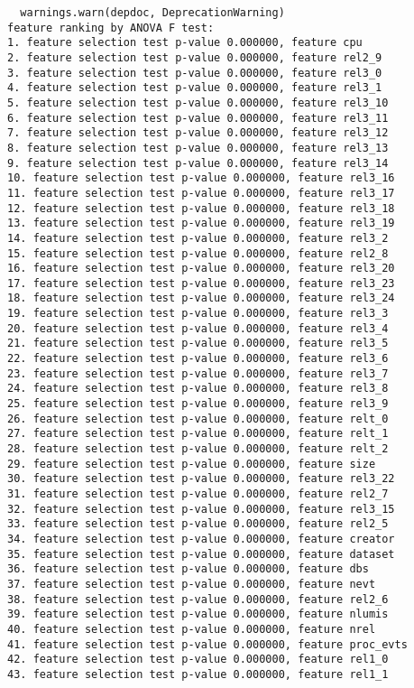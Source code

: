 \begin{verbatim}
  warnings.warn(depdoc, DeprecationWarning)
feature ranking by ANOVA F test:
1. feature selection test p-value 0.000000, feature cpu
2. feature selection test p-value 0.000000, feature rel2_9
3. feature selection test p-value 0.000000, feature rel3_0
4. feature selection test p-value 0.000000, feature rel3_1
5. feature selection test p-value 0.000000, feature rel3_10
6. feature selection test p-value 0.000000, feature rel3_11
7. feature selection test p-value 0.000000, feature rel3_12
8. feature selection test p-value 0.000000, feature rel3_13
9. feature selection test p-value 0.000000, feature rel3_14
10. feature selection test p-value 0.000000, feature rel3_16
11. feature selection test p-value 0.000000, feature rel3_17
12. feature selection test p-value 0.000000, feature rel3_18
13. feature selection test p-value 0.000000, feature rel3_19
14. feature selection test p-value 0.000000, feature rel3_2
15. feature selection test p-value 0.000000, feature rel2_8
16. feature selection test p-value 0.000000, feature rel3_20
17. feature selection test p-value 0.000000, feature rel3_23
18. feature selection test p-value 0.000000, feature rel3_24
19. feature selection test p-value 0.000000, feature rel3_3
20. feature selection test p-value 0.000000, feature rel3_4
21. feature selection test p-value 0.000000, feature rel3_5
22. feature selection test p-value 0.000000, feature rel3_6
23. feature selection test p-value 0.000000, feature rel3_7
24. feature selection test p-value 0.000000, feature rel3_8
25. feature selection test p-value 0.000000, feature rel3_9
26. feature selection test p-value 0.000000, feature relt_0
27. feature selection test p-value 0.000000, feature relt_1
28. feature selection test p-value 0.000000, feature relt_2
29. feature selection test p-value 0.000000, feature size
30. feature selection test p-value 0.000000, feature rel3_22
31. feature selection test p-value 0.000000, feature rel2_7
32. feature selection test p-value 0.000000, feature rel3_15
33. feature selection test p-value 0.000000, feature rel2_5
34. feature selection test p-value 0.000000, feature creator
35. feature selection test p-value 0.000000, feature dataset
36. feature selection test p-value 0.000000, feature dbs
37. feature selection test p-value 0.000000, feature nevt
38. feature selection test p-value 0.000000, feature rel2_6
39. feature selection test p-value 0.000000, feature nlumis
40. feature selection test p-value 0.000000, feature nrel
41. feature selection test p-value 0.000000, feature proc_evts
42. feature selection test p-value 0.000000, feature rel1_0
43. feature selection test p-value 0.000000, feature rel1_1

\end{verbatim}
